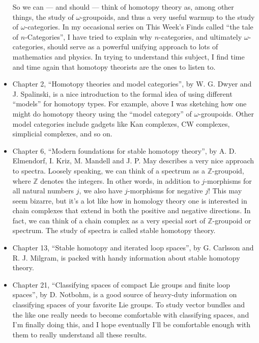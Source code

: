 \documentclass{article}
\begin{document}
\begin{itemize}
  So we can --- and should --- think of homotopy theory as, among other
  things, the study of \(\omega\)-groupoids, and thus a very useful
  warmup to the study of \(\omega\)-categories. In my occasional series
  on This Week's Finds called ``the tale of \(n\)-Categories'', I have
  tried to explain why \(n\)-categories, and ultimately
  \(\omega\)-categories, should serve as a powerful unifying approach to
  lots of mathematics and physics. In trying to understand this subject,
  I find time and time again that homotopy theorists are the ones to
  listen to.
\item
  Chapter 2, ``Homotopy theories and model categories'', by W. G. Dwyer
  and J. Spalinski, is a nice introduction to the formal idea of using
  different ``models'' for homotopy types. For example, above I was
  sketching how one might do homotopy theory using the ``model
  category'' of \(\omega\)-groupoids. Other model categories include
  gadgets like Kan complexes, CW complexes, simplicial complexes, and so
  on.
\item
  Chapter 6, ``Modern foundations for stable homotopy theory'', by A. D.
  Elmendorf, I. Kriz, M. Mandell and J. P. May describes a very nice
  approach to spectra. Loosely speaking, we can think of a spectrum as a
  \(\mathbb{Z}\)-groupoid, where \(\mathbb{Z}\) denotes the integers. In
  other words, in addition to \(j\)-morphisms for all natural numbers
  \(j\), we also have \(j\)-morphisms for negative \(j\)! This may seem
  bizarre, but it's a lot like how in homology theory one is interested
  in chain complexes that extend in both the positive and negative
  directions. In fact, we can think of a chain complex as a very special
  sort of \(\mathbb{Z}\)-groupoid or spectrum. The study of spectra is
  called stable homotopy theory.
\item
  Chapter 13, ``Stable homotopy and iterated loop spaces'', by G.
  Carlsson and R. J. Milgram, is packed with handy information about
  stable homotopy theory.
\item
  Chapter 21, ``Classifying spaces of compact Lie groups and finite loop
  spaces'', by D. Notbohm, is a good source of heavy-duty information on
  classifying spaces of your favorite Lie groups. To study vector
  bundles and the like one really needs to become comfortable with
  classifying spaces, and I'm finally doing this, and I hope eventually
  I'll be comfortable enough with them to really understand all these
  results.
\end{itemize}
\end{document}
